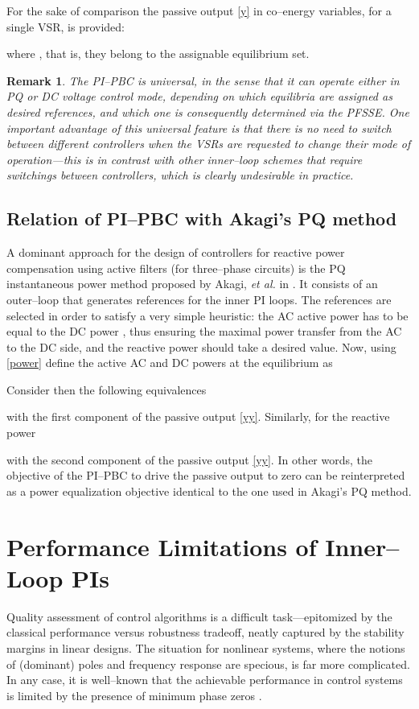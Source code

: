 \documentclass[5p,twocolumn]{elsarticle}
\def\begrem{\begin{remark}\rm}
\def\endrem{\end{remark}}
\newtheorem{remark}[theorem]{Remark}
\numberwithin{equation}{section}
\begin{document}
For the sake of comparison the passive output \eqref{y} in co--energy variables, for a single VSR, is provided:

where , that is, they belong to the assignable equilibrium set.

\begrem\label{universal}
The PI--PBC is \textit{universal}, in the sense that it can operate either in \textit{PQ} or \textit{DC voltage control mode}, depending on which equilibria are assigned as desired references, and which one is consequently determined via the PFSSE. One important advantage of this universal feature is that there is {\em no need to switch} between different controllers when the VSRs are requested to change their mode of operation---this is in contrast with other inner--loop schemes that require switchings between controllers, which is clearly undesirable in practice.
\endrem
\subsection{Relation of PI--PBC with Akagi's PQ method }
\label{akamet}
A dominant approach for the design of controllers for reactive power compensation using active filters (for three--phase circuits) is the PQ instantaneous power method proposed by Akagi, {\em et al.} in
\cite{akagi}. It consists of an outer--loop that generates references for the inner PI loops. The references are selected in order to satisfy a very simple heuristic: the AC active power  has to be equal to
the DC power , thus ensuring the maximal power transfer from the AC to the DC side, and the reactive power should take a desired value. Now, using  \eqref{power} define the active AC and DC powers at the equilibrium as

Consider then the following equivalences


with  the first component of the passive output  \eqref{yy}. Similarly, for the reactive power


with  the second component of the passive output  \eqref{yy}. In other words, the objective of the PI--PBC to drive the passive output  to zero can be reinterpreted as a power equalization objective
identical to the one used in Akagi's PQ method.

\section{Performance Limitations of Inner--Loop PIs}
\label{zdsection}
Quality assessment of control algorithms is a difficult task---epitomized by the classical performance versus robustness tradeoff, neatly captured by the stability margins in linear designs. The situation for
nonlinear systems, where the notions of (dominant) poles and frequency response are specious, is far more complicated. In any case, it is well--known that the achievable performance in control systems is
limited by the presence of minimum phase zeros \cite{FRAZAM,QIUDAV,SERetal}.
\end{document}

